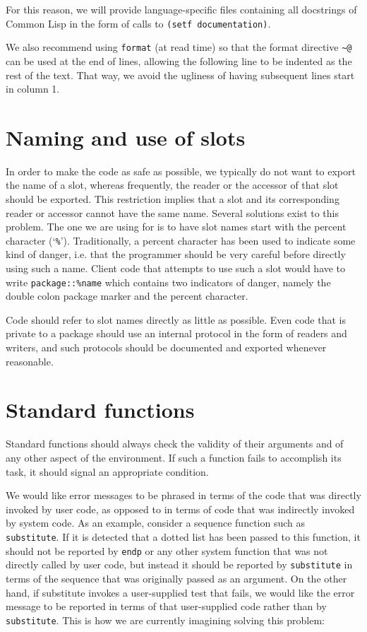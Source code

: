For this reason, we will provide language-specific files containing
all docstrings of Common Lisp in the form of calls to \texttt{(setf
documentation)}. 

We also recommend using \texttt{format} (at read time) so that the
format directive \texttt{\~{}@} can be used at the end of lines,
allowing the following line to be indented as the rest of the text.
That way, we avoid the ugliness of having subsequent lines start in
column 1.

\section{Naming and use of slots}

In order to make the code as safe as possible, we typically do not
want to export the name of a slot, whereas frequently, the reader or
the accessor of that slot should be exported.  This restriction
implies that a slot and its corresponding reader or accessor cannot
have the same name.  Several solutions exist to this problem.  The one
we are using for \sysname{} is to have slot names start with the
percent character (`\texttt{\%}').  Traditionally, a percent character
has been used to indicate some kind of danger, i.e. that the
programmer should be very careful before directly using such a name.
Client code that attempts to use such a slot would have to write
\texttt{package::\%name} which contains two indicators of danger,
namely the double colon package marker and the percent character.

Code should refer to slot names directly as little as possible.  Even
code that is private to a package should use an internal protocol in
the form of readers and writers, and such protocols should be
documented and exported whenever reasonable. 

\section{Standard functions}

Standard functions should always check the validity of their arguments
and of any other aspect of the environment.  If such a function fails
to accomplish its task, it should signal an appropriate condition.  

We would like error messages to be phrased in terms of the code that
was directly invoked by user code, as opposed to in terms of code that
was indirectly invoked by system code.  As an example, consider a
sequence function such as \texttt{substitute}.  If it is detected that
a dotted list has been passed to this function, it should not be
reported by \texttt{endp} or any other system function that was not
directly called by user code, but instead it should be reported by
\texttt{substitute} in terms of the sequence that was originally
passed as an argument.  On the other hand, if substitute invokes a
user-supplied test that fails, we would like the error message to be
reported in terms of that user-supplied code rather than by
\texttt{substitute}.  This is how we are currently imagining solving
this problem:

